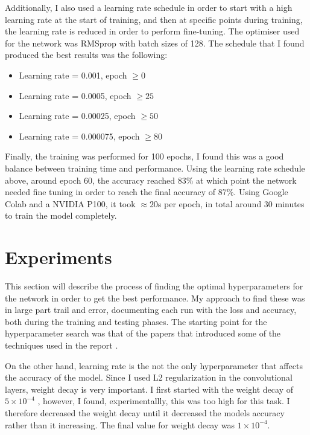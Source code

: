 \documentclass[12pt]{article}
\begin{document}
Additionally, I also used a learning rate schedule in order to start with a high learning rate at the start of training, and then at specific points during training, the learning rate is reduced in order to perform fine-tuning. The optimiser used for the network was RMSprop with batch sizes of 128. The schedule that I found produced the best results was the following:

\begin{itemize}
  \item Learning rate = 0.001, epoch $\geq 0$
  \item Learning rate = 0.0005, epoch $\ge 25$
  \item Learning rate = 0.00025, epoch $\ge 50$
  \item Learning rate = 0.000075, epoch $\ge 80$
\end{itemize}

Finally, the training was performed for 100 epochs, I found this was a good balance between training time and performance. Using the learning rate schedule above, around epoch 60, the accuracy reached 83\% at which point the network needed fine tuning in order to reach the final accuracy of 87\%. Using Google Colab and a NVIDIA P100, it took $\approx 20$s per epoch, in total around 30 minutes to train the model completely.

\section{Experiments}
This section will describe the process of finding the optimal hyperparameters for the network in order to get the best performance. My approach to find these was in large part trail and error, documenting each run with the loss and accuracy, both during the training and testing phases. The starting point for the hyperparameter search was that of the papers that introduced some of the techniques used in the report \cite{simonyan2014deep}.

On the other hand, learning rate is the not the only hyperparameter that affects the accuracy of the model. Since I used L2 regularization in the convolutional layers, weight decay is very important. I first started with the weight decay of $5\times 10^{-4}$ \cite{simonyan2014deep}, however, I found, experimentallly, this was too high for this task. I therefore decreased the weight decay until it decreased the models accuracy rather than it increasing. The final value for weight decay was $1\times 10^{-4}$.
\end{document}
